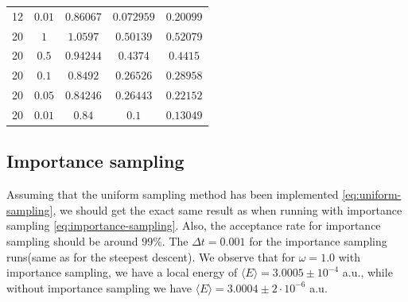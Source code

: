 \documentclass[11pt]{article}
\begin{document}
\begin{table}[H]
\begin{tabular}{c c c c c}
		12 &$           0.01$ &$        0.86067$ &$       0.072959$ &$        0.20099$ \\ 
		20 &$              1$ &$         1.0597$ &$        0.50139$ &$        0.52079$ \\ 
		20 &$            0.5$ &$        0.94244$ &$         0.4374$ &$         0.4415$ \\ 
		20 &$            0.1$ &$         0.8492$ &$        0.26526$ &$        0.28958$ \\ 
		20 &$           0.05$ &$        0.84246$ &$        0.26443$ &$        0.22152$ \\ 
		20 &$           0.01$ &$           0.84$ &$            0.1$ &$        0.13049$ \\ 
		\hline \hline
	\end{tabular}
	\label{tab:optimal-parameters}
\end{table}

\subsection{Importance sampling}
Assuming that the uniform sampling method has been implemented \eqref{eq:uniform-sampling}, we should get the exact same result as when running with importance sampling \eqref{eq:importance-sampling}. Also, the acceptance rate for importance sampling should be around $99\% $\cite{komp2015}. The $\Delta t = 0.001$ for the importance sampling runs(same as for the steepest descent). We observe that for $\omega=1.0$ with importance sampling, we have a local energy of $\langle E\rangle = 3.0005\pm 10^{-4}$ a.u., while without importance sampling we have $\langle E\rangle = 3.0004\pm 2\cdot10^{-6}$ a.u.
\end{document}
